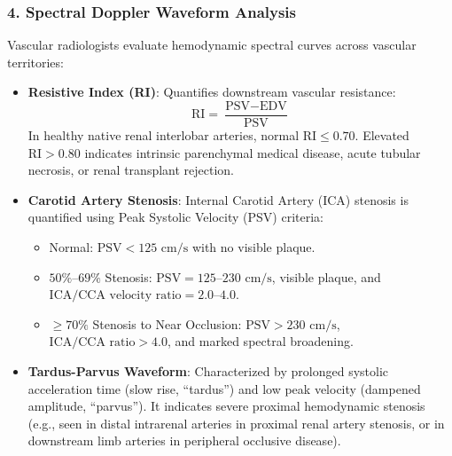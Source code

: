 \documentclass[11pt,a4paper]{article}
\begin{document}
\subsubsection{4. Spectral Doppler Waveform Analysis}
Vascular radiologists evaluate hemodynamic spectral curves across vascular territories:
\begin{itemize}[leftmargin=*]
    \item \textbf{Resistive Index (RI)}: Quantifies downstream vascular resistance:
    \begin{equation}
        \text{RI} = \frac{\text{PSV} - \text{EDV}}{\text{PSV}}
    \end{equation}
    In healthy native renal interlobar arteries, normal $\text{RI} \le 0.70$. Elevated $\text{RI} > 0.80$ indicates intrinsic parenchymal medical disease, acute tubular necrosis, or renal transplant rejection.
    \item \textbf{Carotid Artery Stenosis}: Internal Carotid Artery (ICA) stenosis is quantified using Peak Systolic Velocity (PSV) criteria:
    \begin{itemize}
        \item Normal: $\text{PSV} < 125\text{ cm/s}$ with no visible plaque.
        \item $50\%\text{--}69\%$ Stenosis: $\text{PSV} = 125\text{--}230\text{ cm/s}$, visible plaque, and $\text{ICA/CCA velocity ratio} = 2.0\text{--}4.0$.
        \item $\ge 70\%$ Stenosis to Near Occlusion: $\text{PSV} > 230\text{ cm/s}$, $\text{ICA/CCA ratio} > 4.0$, and marked spectral broadening.
    \end{itemize}
    \item \textbf{Tardus-Parvus Waveform}: Characterized by prolonged systolic acceleration time (slow rise, ``tardus'') and low peak velocity (dampened amplitude, ``parvus''). It indicates severe proximal hemodynamic stenosis (e.g., seen in distal intrarenal arteries in proximal renal artery stenosis, or in downstream limb arteries in peripheral occlusive disease).
\end{itemize}
\end{document}
